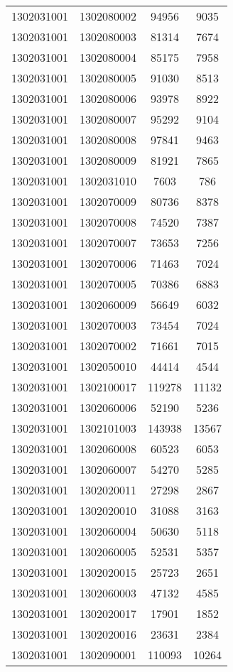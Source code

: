 \begin{longtable}[h]{llcc}
		1302031001 & 1302080002 & 94956 & 9035\\
		1302031001 & 1302080003 & 81314 & 7674\\
		1302031001 & 1302080004 & 85175 & 7958\\
		1302031001 & 1302080005 & 91030 & 8513\\
		1302031001 & 1302080006 & 93978 & 8922\\
		1302031001 & 1302080007 & 95292 & 9104\\
		1302031001 & 1302080008 & 97841 & 9463\\
		1302031001 & 1302080009 & 81921 & 7865\\
		1302031001 & 1302031010 & 7603 & 786\\
		1302031001 & 1302070009 & 80736 & 8378\\
		1302031001 & 1302070008 & 74520 & 7387\\
		1302031001 & 1302070007 & 73653 & 7256\\
		1302031001 & 1302070006 & 71463 & 7024\\
		1302031001 & 1302070005 & 70386 & 6883\\
		1302031001 & 1302060009 & 56649 & 6032\\
		1302031001 & 1302070003 & 73454 & 7024\\
		1302031001 & 1302070002 & 71661 & 7015\\
		1302031001 & 1302050010 & 44414 & 4544\\
		1302031001 & 1302100017 & 119278 & 11132\\
		1302031001 & 1302060006 & 52190 & 5236\\
		1302031001 & 1302101003 & 143938 & 13567\\
		1302031001 & 1302060008 & 60523 & 6053\\
		1302031001 & 1302060007 & 54270 & 5285\\
		1302031001 & 1302020011 & 27298 & 2867\\
		1302031001 & 1302020010 & 31088 & 3163\\
		1302031001 & 1302060004 & 50630 & 5118\\
		1302031001 & 1302060005 & 52531 & 5357\\
		1302031001 & 1302020015 & 25723 & 2651\\
		1302031001 & 1302060003 & 47132 & 4585\\
		1302031001 & 1302020017 & 17901 & 1852\\
		1302031001 & 1302020016 & 23631 & 2384\\
		1302031001 & 1302090001 & 110093 & 10264\\

\end{longtable}
